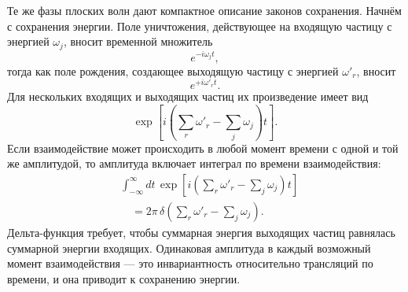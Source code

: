 Те же фазы плоских волн дают компактное описание законов сохранения. Начнём с сохранения энергии. Поле уничтожения, действующее на входящую частицу с энергией \(\omega_j\), вносит временной множитель
\begin{equation}
e^{-i\omega_j t},
\end{equation}
тогда как поле рождения, создающее выходящую частицу с энергией \(\omega'_r\), вносит
\begin{equation}
e^{+i\omega'_r t}.
\end{equation}
Для нескольких входящих и выходящих частиц их произведение имеет вид
\begin{equation}
\exp\!\left[
i\left(\sum_r\omega'_r-\sum_j\omega_j\right)t
\right].
\end{equation}
Если взаимодействие может происходить в любой момент времени с одной и той же амплитудой, то амплитуда включает интеграл по времени взаимодействия:
\begin{equation}
\begin{aligned}
&\int_{-\infty}^{\infty}dt\,
\exp\!\left[
i\left(\sum_r\omega'_r-\sum_j\omega_j\right)t
\right]
\\
&\quad =2\pi\,
\delta\!\left(\sum_r\omega'_r-\sum_j\omega_j\right).
\end{aligned}
\end{equation}
Дельта-функция требует, чтобы суммарная энергия выходящих частиц равнялась суммарной энергии входящих. Одинаковая амплитуда в каждый возможный момент взаимодействия — это инвариантность относительно трансляций по времени, и она приводит к сохранению энергии.

